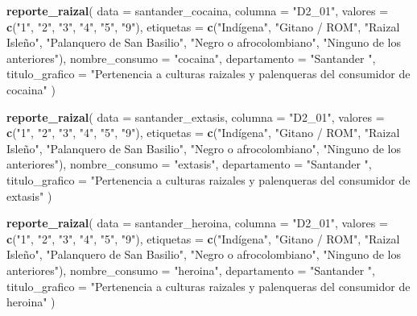 \documentclass[
]{article}
\newenvironment{Shaded}{\begin{snugshade}}{\end{snugshade}}
\newcommand{\AttributeTok}[1]{\textcolor[rgb]{0.13,0.29,0.53}{#1}}
\newcommand{\FunctionTok}[1]{\textcolor[rgb]{0.13,0.29,0.53}{\textbf{#1}}}
\newcommand{\NormalTok}[1]{#1}
\newcommand{\StringTok}[1]{\textcolor[rgb]{0.31,0.60,0.02}{#1}}
\begin{document}
\begin{Shaded}
\begin{Highlighting}[]
\FunctionTok{reporte\_raizal}\NormalTok{(}
  \AttributeTok{data =}\NormalTok{ santander\_cocaina,}
  \AttributeTok{columna =} \StringTok{"D2\_01"}\NormalTok{,}
  \AttributeTok{valores =} \FunctionTok{c}\NormalTok{(}\StringTok{"1"}\NormalTok{, }\StringTok{"2"}\NormalTok{, }\StringTok{"3"}\NormalTok{, }\StringTok{"4"}\NormalTok{, }\StringTok{"5"}\NormalTok{, }\StringTok{"9"}\NormalTok{),}
  \AttributeTok{etiquetas =} \FunctionTok{c}\NormalTok{(}\StringTok{"Indígena"}\NormalTok{, }\StringTok{"Gitano / ROM"}\NormalTok{, }\StringTok{"Raizal Isleño"}\NormalTok{, }\StringTok{"Palanquero de San Basilio"}\NormalTok{, }\StringTok{"Negro o afrocolombiano"}\NormalTok{, }\StringTok{"Ninguno de los anteriores"}\NormalTok{),}
  \AttributeTok{nombre\_consumo =} \StringTok{"cocaina"}\NormalTok{,}
  \AttributeTok{departamento =} \StringTok{"Santander "}\NormalTok{,}
  \AttributeTok{titulo\_grafico =} \StringTok{"Pertenencia a culturas raizales y palenqueras del consumidor de cocaina"}
\NormalTok{)}

\FunctionTok{reporte\_raizal}\NormalTok{(}
  \AttributeTok{data =}\NormalTok{ santander\_extasis,}
  \AttributeTok{columna =} \StringTok{"D2\_01"}\NormalTok{,}
  \AttributeTok{valores =} \FunctionTok{c}\NormalTok{(}\StringTok{"1"}\NormalTok{, }\StringTok{"2"}\NormalTok{, }\StringTok{"3"}\NormalTok{, }\StringTok{"4"}\NormalTok{, }\StringTok{"5"}\NormalTok{, }\StringTok{"9"}\NormalTok{),}
  \AttributeTok{etiquetas =} \FunctionTok{c}\NormalTok{(}\StringTok{"Indígena"}\NormalTok{, }\StringTok{"Gitano / ROM"}\NormalTok{, }\StringTok{"Raizal Isleño"}\NormalTok{, }\StringTok{"Palanquero de San Basilio"}\NormalTok{, }\StringTok{"Negro o afrocolombiano"}\NormalTok{, }\StringTok{"Ninguno de los anteriores"}\NormalTok{),}
  \AttributeTok{nombre\_consumo =} \StringTok{"extasis"}\NormalTok{,}
  \AttributeTok{departamento =} \StringTok{"Santander "}\NormalTok{,}
  \AttributeTok{titulo\_grafico =} \StringTok{"Pertenencia a culturas raizales y palenqueras del consumidor de extasis"}
\NormalTok{)}

\FunctionTok{reporte\_raizal}\NormalTok{(}
  \AttributeTok{data =}\NormalTok{ santander\_heroina,}
  \AttributeTok{columna =} \StringTok{"D2\_01"}\NormalTok{,}
  \AttributeTok{valores =} \FunctionTok{c}\NormalTok{(}\StringTok{"1"}\NormalTok{, }\StringTok{"2"}\NormalTok{, }\StringTok{"3"}\NormalTok{, }\StringTok{"4"}\NormalTok{, }\StringTok{"5"}\NormalTok{, }\StringTok{"9"}\NormalTok{),}
  \AttributeTok{etiquetas =} \FunctionTok{c}\NormalTok{(}\StringTok{"Indígena"}\NormalTok{, }\StringTok{"Gitano / ROM"}\NormalTok{, }\StringTok{"Raizal Isleño"}\NormalTok{, }\StringTok{"Palanquero de San Basilio"}\NormalTok{, }\StringTok{"Negro o afrocolombiano"}\NormalTok{, }\StringTok{"Ninguno de los anteriores"}\NormalTok{),}
  \AttributeTok{nombre\_consumo =} \StringTok{"heroina"}\NormalTok{,}
  \AttributeTok{departamento =} \StringTok{"Santander "}\NormalTok{,}
  \AttributeTok{titulo\_grafico =} \StringTok{"Pertenencia a culturas raizales y palenqueras del consumidor de heroina"}
\NormalTok{)}


\end{Highlighting}
\end{Shaded}
\end{document}
